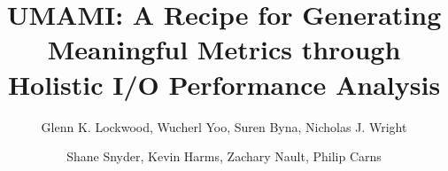 \documentclass[sigconf,10pt]{acmart}
\begin{document}
\title{UMAMI: A Recipe for Generating Meaningful Metrics through Holistic I/O Performance Analysis}

\author{Glenn K. Lockwood, Wucherl Yoo, Suren Byna, Nicholas J. Wright}

\author{Shane Snyder, Kevin Harms, Zachary Nault, Philip Carns}

\renewcommand{\shortauthors}{G. Lockwood et al.}

\renewcommand{\shorttitle}{UMAMI: A Recipe for Generating Meaningful I/O Metrics}

\maketitle












\end{document}
